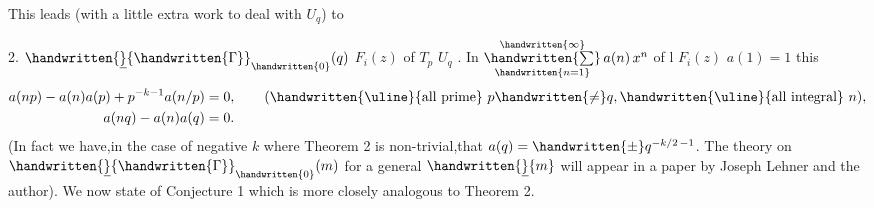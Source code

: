 This leads (with a little extra work to deal with $U_q$) to

 2.  $\handwritten{\underline}{\handwritten{\Gamma}}_{\handwritten{0}}(q)$  $F_i(z)$   of  $T_p$  $U_q$ . In  $\mathop{\handwritten{\sum}}\limits_{\handwritten{n=1}}^{\handwritten{\infty}}a(n)\,x^n$ of l $F_i(z)$  $a(1)=1$ this  
\[
 \begin{aligned}
 a(np)-a(n)a(p)+p^{-k-1}a(n/p)&=0,\qquad (\text{\handwritten{\uline}{all prime} }p\handwritten{\ne}q,\text{\handwritten{\uline}{all integral} } n),\\
 a(nq)-a(n)a(q)&=0. 
 \end{aligned}
\]
\margin{\handwritten{\#}}
(In fact we have,in the case of negative $k$ where Theorem 2 is non-trivial,that $a(q)=\mathbin{\handwritten{\pm}}q^{-k/2\,-1}$. The theory on $\handwritten{\underline}{\handwritten{\Gamma}}_{\handwritten{0}}(m)$ for a general $\handwritten{\underline}{m}$ will appear in a paper by Joseph Lehner and the author). We now state of Conjecture 1 which is more closely analogous to Theorem 2.
